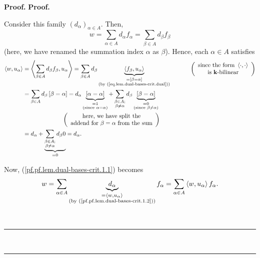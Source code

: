 \documentclass[numbers=enddot,12pt,final,onecolumn,notitlepage]{scrartcl}%
\theoremstyle{definition}
\newenvironment{proof}[1][Proof]{\noindent\textbf{#1.} }{\ \rule{0.5em}{0.5em}}
\let\sumnonlimits\sum
\renewcommand{\sum}{\sumnonlimits\limits}
\newenvironment{verlong}{}{}
\newenvironment{vershort}{}{}
\begin{document}
\begin{proof}
\begin{proof}
\begin{vershort}
\end{vershort}

\begin{verlong}
\noindent Consider this family $\left(  d_{\alpha}\right)  _{\alpha\in A}$.
Then,
\[
w=\sum_{\alpha\in A}d_{\alpha}f_{\alpha}=\sum_{\beta\in A}d_{\beta}f_{\beta}%
\]
(here, we have renamed the summation index $\alpha$ as $\beta$). Hence, each
$\alpha\in A$ satisfies%
\begin{align}
\left\langle w,u_{\alpha}\right\rangle  &  =\left\langle \sum_{\beta\in
A}d_{\beta}f_{\beta},u_{\alpha}\right\rangle =\sum_{\beta\in A}d_{\beta
}\underbrace{\left\langle f_{\beta},u_{\alpha}\right\rangle }%
_{\substack{=\left[  \beta=\alpha\right]  \\\text{(by
(\ref{eq.lem.dual-bases-crit.dual}))}}}\ \ \ \ \ \ \ \ \ \ \left(
\begin{array}
[c]{c}%
\text{since the form }\left\langle \cdot,\cdot\right\rangle \\
\text{is }\mathbf{k}\text{-bilinear}%
\end{array}
\right) \nonumber\\
&  =\sum_{\beta\in A}d_{\beta}\left[  \beta=\alpha\right]  =d_{\alpha
}\underbrace{\left[  \alpha=\alpha\right]  }_{\substack{=1\\\text{(since
}\alpha=\alpha\text{)}}}+\sum_{\substack{\beta\in A;\\\beta\neq\alpha
}}d_{\beta}\underbrace{\left[  \beta=\alpha\right]  }%
_{\substack{=0\\\text{(since }\beta\neq\alpha\text{)}}}\nonumber\\
&  \ \ \ \ \ \ \ \ \ \ \ \ \ \ \ \ \ \ \ \ \left(
\begin{array}
[c]{c}%
\text{here, we have split the}\\
\text{addend for }\beta=\alpha\text{ from the sum}%
\end{array}
\right) \nonumber\\
&  =d_{\alpha}+\underbrace{\sum_{\substack{\beta\in A;\\\beta\neq\alpha
}}d_{\beta}0}_{=0}=d_{\alpha}. \label{pf.pf.lem.dual-bases-crit.1.2}%
\end{align}


Now, (\ref{pf.pf.lem.dual-bases-crit.1.1}) becomes%
\[
w=\sum_{\alpha\in A}\underbrace{d_{\alpha}}_{\substack{=\left\langle
w,u_{\alpha}\right\rangle \\\text{(by (\ref{pf.pf.lem.dual-bases-crit.1.2}))}%
}}f_{\alpha}=\sum_{\alpha\in A}\left\langle w,u_{\alpha}\right\rangle
f_{\alpha}.
\]


\end{verlong}
\end{proof}
\end{proof}
\end{document}
